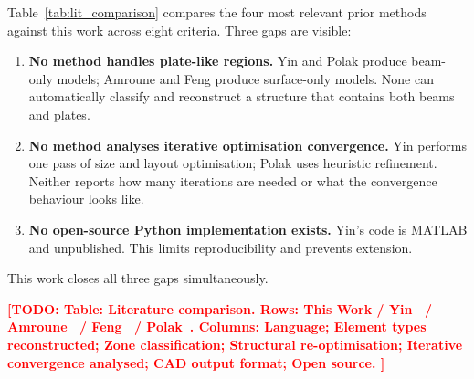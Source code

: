 \documentclass[11pt,a4paper]{article}
\newcommand{\TODO}[1]{\textcolor{red}{\textbf{[TODO: #1]}}}
\newcommand{\tblstub}[1]{\TODO{Table: #1}}
\begin{document}

Table~\ref{tab:lit_comparison} compares the four most relevant prior methods
against this work across eight criteria.
Three gaps are visible:

\begin{enumerate}
  \item \textbf{No method handles plate-like regions.}
        Yin and Polak produce beam-only models; Amroune and Feng produce
        surface-only models. None can automatically classify and reconstruct
        a structure that contains both beams and plates.

  \item \textbf{No method analyses iterative optimisation convergence.}
        Yin performs one pass of size and layout optimisation; Polak uses
        heuristic refinement. Neither reports how many iterations are needed
        or what the convergence behaviour looks like.

  \item \textbf{No open-source Python implementation exists.}
        Yin's code is MATLAB and unpublished. This limits reproducibility
        and prevents extension.
\end{enumerate}

This work closes all three gaps simultaneously.

\tblstub{%
  Literature comparison. Rows: This Work / Yin~\cite{yin2020} /
  Amroune~\cite{amroune2021} / Feng~\cite{feng2025} /
  Polak~\cite{polak2023}.
  Columns: Language; Element types reconstructed; Zone classification;
  Structural re-optimisation; Iterative convergence analysed; CAD output
  format; Open source.
  \label{tab:lit_comparison}%
}
\end{document}

